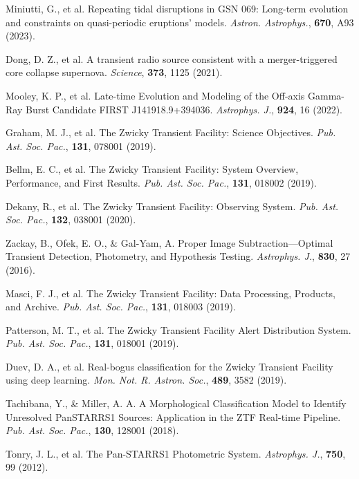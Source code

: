 \documentclass{nature_plusfigure}
\newcommand{\mn}{{Mon. Not. R. Astron. Soc.}}
\newcommand{\mnras}{\mn}
\newcommand{\apj}{{Astrophys. J.}}
\newcommand{\aap}{{Astron. Astrophys.}}
\newcommand{\pasp}{{Pub. Ast. Soc. Pac.}}
\begin{document}
\begin{methods}
\begin{thebibliography}{10}
 Miniutti, G., et al. Repeating tidal disruptions in GSN 069: Long-term evolution and constraints on quasi-periodic eruptions' models. \emph{\aap}, \textbf{670}, A93 (2023). 


 Dong, D. Z., et al. A transient radio source consistent with a merger-triggered core collapse supernova. \emph{Science}, \textbf{373}, 1125 (2021). 

 Mooley, K. P., et al. Late-time Evolution and Modeling of the Off-axis Gamma-Ray Burst Candidate FIRST J141918.9+394036. \emph{\apj}, \textbf{924}, 16 (2022). 



 Graham, M. J., et al. The Zwicky Transient Facility: Science Objectives. \emph{\pasp}, \textbf{131}, 078001 (2019). 

 Bellm, E. C., et al. The Zwicky Transient Facility: System Overview, Performance, and First Results. \emph{\pasp}, \textbf{131}, 018002 (2019). 

 Dekany, R., et al. The Zwicky Transient Facility: Observing System. \emph{\pasp}, \textbf{132}, 038001 (2020). 

 Zackay, B., Ofek, E. O., \& Gal-Yam, A. Proper Image Subtraction—Optimal Transient Detection, Photometry, and Hypothesis Testing. \emph{\apj}, \textbf{830}, 27 (2016). 

 Masci, F. J., et al. The Zwicky Transient Facility: Data Processing, Products, and Archive. \emph{\pasp}, \textbf{131}, 018003 (2019). 

 Patterson, M. T., et al. The Zwicky Transient Facility Alert Distribution System. \emph{\pasp}, \textbf{131}, 018001 (2019). 

  Duev, D. A., et al. Real-bogus classification for the Zwicky Transient Facility using deep learning. \emph{\mnras}, \textbf{489}, 3582 (2019). 

 Tachibana, Y., \& Miller, A. A. A Morphological Classification Model to Identify Unresolved PanSTARRS1 Sources: Application in the ZTF Real-time Pipeline. \emph{\pasp}, \textbf{130}, 128001 (2018). 


 Tonry, J. L., et al. The Pan-STARRS1 Photometric System. \emph{\apj}, \textbf{750}, 99 (2012). 


\end{thebibliography}
\end{methods}
\end{document}
